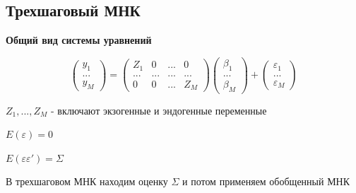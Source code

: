 \documentclass[a4paper, 12pt]{article}
\begin{document}
\subsection{Трехшаговый МНК}

\begin{center}
    \textbf{Общий вид системы уравнений}
\end{center}

\[
\begin{pmatrix} y_{1} \\ ... \\ y_{M} \end{pmatrix} = \begin{pmatrix} Z_{1} & 0 & ... & 0 \\ ... & ... & ... & ... \\ 0 & 0 & ... & Z_{M} \end{pmatrix} \begin{pmatrix} \beta_{1} \\ ... \\ \beta_{M} \end{pmatrix} + \begin{pmatrix} \varepsilon_{1} \\ ... \\ \varepsilon_{M} \end{pmatrix}
\]

$Z_{1}, ..., Z_{M}$ - включают экзогенные и эндогенные переменные

$E(\varepsilon) = 0$

$E(\varepsilon \varepsilon') = \Sigma$

В трехшаговом МНК находим оценку $\Sigma$ и потом применяем обобщенный МНК
\end{document}

